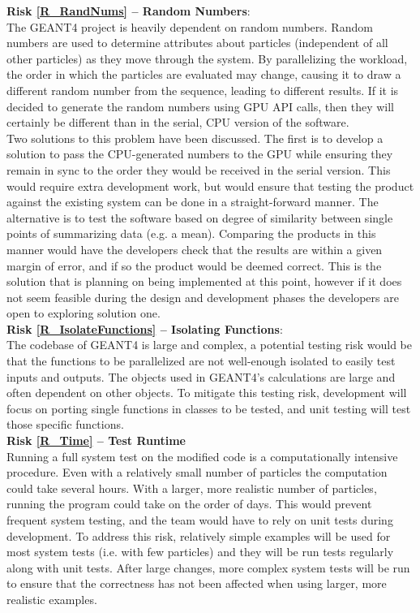 \documentclass[12pt]{article}
\begin{document}
\textbf{Risk \ref{R_RandNums} -- Random Numbers}:\\
The GEANT4 project is heavily dependent on random numbers. Random numbers are used to determine attributes about particles (independent of all other particles) as they move through the system. By parallelizing the workload, the order in which the particles are evaluated may change, causing it to draw a different random number from the sequence, leading to different results. If it is decided to generate the random numbers using GPU API calls, then they will certainly be different than in the serial, CPU version of the software.\\

Two solutions to this problem have been discussed. The first is to develop a solution to pass the CPU-generated numbers to the GPU while ensuring they remain in sync to the order they would be received in the serial version. This would require extra development work, but would ensure that testing the product against the existing system can be done in a straight-forward manner. The alternative is to test the software based on degree of similarity between single points of summarizing data (e.g. a mean). Comparing the products in this manner would have the developers check that the results are within a given margin of error, and if so the product would be deemed correct. This is the solution that is planning on being implemented at this point, however if it does not seem feasible during the design and development phases the developers are open to exploring solution one.\\

\textbf{Risk \ref{R_IsolateFunctions} -- Isolating Functions}:\\
The codebase of GEANT4 is large and complex, a potential testing risk would be that the functions to be parallelized are not well-enough isolated to easily test inputs and outputs. The objects used in GEANT4's calculations are large and often dependent on other objects. To mitigate this testing risk, development will focus on porting single functions in classes to be tested, and unit testing will test those specific functions.\\

\textbf{Risk \ref{R_Time} -- Test Runtime}\\
Running a full system test on the modified code is a computationally intensive procedure. Even with a relatively small number of particles the computation could take several hours. With a larger, more realistic number of particles, running the program could take on the order of days. This would prevent frequent system testing, and the team would have to rely on unit tests during development. To address this risk, relatively simple examples will be used for most system tests (i.e. with few particles) and they will be run tests regularly along with unit tests. After large changes, more complex system tests will be run to ensure that the correctness has not been affected when using larger, more realistic examples.
\end{document}
